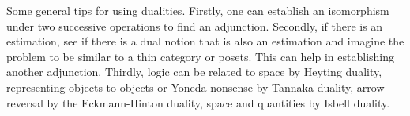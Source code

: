 \documentclass[10pt]{article}
\theoremstyle{plain}%
\theoremstyle{definition}
\theoremstyle{remark}
\begin{document}
Some general tips for using dualities. Firstly, one can establish an isomorphism under two successive operations to find an adjunction. Secondly, if there is an estimation, see if there is a dual notion that is also an estimation and imagine the problem to be similar to a thin category or posets. This can help in establishing another adjunction. Thirdly, logic can be related to space by Heyting duality, representing objects to objects or Yoneda nonsense by Tannaka duality, arrow reversal by the Eckmann-Hinton duality, space and quantities by Isbell duality.
\end{document}
